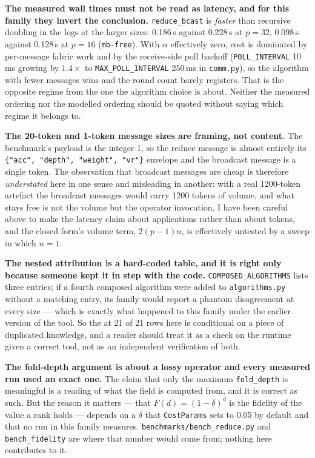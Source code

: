 \documentclass[11pt]{article}
\begin{document}
\textbf{The measured wall times must not be read as latency, and for this family they invert the
conclusion.} \texttt{reduce\_bcast} is \emph{faster} than recursive doubling in the logs at the
larger sizes: 0.186\,s against 0.228\,s at $p=32$, 0.098\,s against 0.128\,s at $p=16$
(\texttt{mb-free}). With $\alpha$ effectively zero, cost is dominated by per-message fabric work
and by the receive-side poll backoff (\texttt{POLL\_INTERVAL} 10\,ms growing by $1.4\times$ to
\texttt{MAX\_POLL\_INTERVAL} 250\,ms in \texttt{comm.py}), so the algorithm with fewer messages
wins and the round count barely registers. That is the opposite regime from the one the algorithm
choice is about. Neither the measured ordering nor the modelled ordering should be quoted without
saying which regime it belongs to.

\textbf{The 20-token and 1-token message sizes are framing, not content.} The benchmark's payload
is the integer 1, so the reduce message is almost entirely its \texttt{\{"acc", "depth",
"weight", "vr"\}} envelope and the broadcast message is a single token. The observation that
broadcast messages are cheap is therefore \emph{understated} here in one sense and misleading in
another: with a real 1200-token artefact the broadcast messages would carry 1200 tokens of
volume, and what stays free is not the volume but the operator invocation. I have been careful
above to make the latency claim about applications rather than about tokens, and the closed
form's volume term, $2(p-1)n$, is effectively untested by a sweep in which $n=1$.

\textbf{The nested attribution is a hard-coded table, and it is right only because someone kept
it in step with the code.} \texttt{COMPOSED\_ALGORITHMS} lists three entries; if a fourth
composed algorithm were added to \texttt{algorithms.py} without a matching entry, its family
would report a phantom disagreement at every size --- which is exactly what happened to this
family under the earlier version of the tool. So the \modelok{} at 21 of 21 rows here is
conditional on a piece of duplicated knowledge, and a reader should treat it as a check on the
runtime given a correct tool, not as an independent verification of both.

\textbf{The fold-depth argument is about a lossy operator and every measured run used an exact
one.} The claim that only the maximum \texttt{fold\_depth} is meaningful is a reading of what the
field is computed from, and it is correct as such. But the reason it matters --- that
$F(d) = (1-\delta)^d$ is the fidelity of the value a rank holds --- depends on a $\delta$ that
\texttt{CostParams} sets to 0.05 by default and that no run in this family measures.
\texttt{benchmarks/bench\_reduce.py} and \texttt{bench\_fidelity} are where that number would
come from; nothing here contributes to it.
\end{document}
